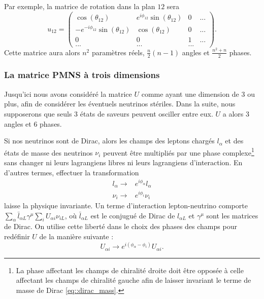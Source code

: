         Par exemple, la matrice de rotation dans la plan $12$ sera
        \begin{equation}
          u_{12} = 
          \left(\begin{matrix}
            \cos(\theta_{12}) & e^{i\phi_{12}}\sin(\theta_{12}) & 0 & ... \\
            -e^{-i\phi_{12}}\sin(\theta_{12}) & \cos(\theta_{12}) & 0 & ... \\
            0 & 0 & 1 & ... \\
            ... & ... & ... &
          \end{matrix}\right).
        \end{equation}
        Cette matrice aura alors $n^2$ paramètres réels, $\frac{n}{2}(n-1)$ angles  et $\frac{n^2+n}{2}$ phases.

      \subsubsection{La matrice PMNS à trois dimensions}
        Jusqu'ici nous avons considéré la matrice $U$ comme ayant une dimension de 3 ou plus, afin de considérer les éventuels neutrinos stériles. Dans la suite, nous supposerons que seuls 3 états de saveurs peuvent osciller entre eux. $U$ a alors 3 angles et 6 phases.
        
        Si nos neutrinos sont de Dirac, alors les champs des leptons chargés $l_{\alpha}$ et des états de masse des neutrinos $\nu_i$ peuvent être multipliés par une phase complexe\footnote{La phase affectant les champs de chiralité droite doit être opposée à celle affectant les champs de chiralité gauche afin de laisser invariant le terme de masse de Dirac \eqref{eq::dirac_mass}.} sans changer ni leurs lagrangiens libres ni leurs lagrangiens d'interaction. En d'autres termes, effectuer la transformation 
        \begin{eqnarray}
          l_{\alpha}\to & e^{i\phi_{\alpha}}l_{\alpha} \\
          \nu_i\to & e^{i\phi_i}\nu_i 
        \end{eqnarray}
        laisse la physique invariante. Un terme d'interaction lepton-neutrino comporte $\sum_{\alpha}\bar{l}_{\alpha L}\gamma^{\mu}\sum_i U_{\alpha i}\nu_{i L}$, où $\bar{l}_{\alpha L}$ est le conjugué de Dirac de $l_{\alpha L}$ et $\gamma^{\mu}$ sont les matrices de Dirac. On utilise cette liberté dans le choix des phases des champs pour redéfinir $U$ de la manière suivante :
        \begin{equation}
          U_{\alpha i}\to e^{i(\phi_{\alpha}-\phi_i)}U_{\alpha i}.
        \end{equation}
        
